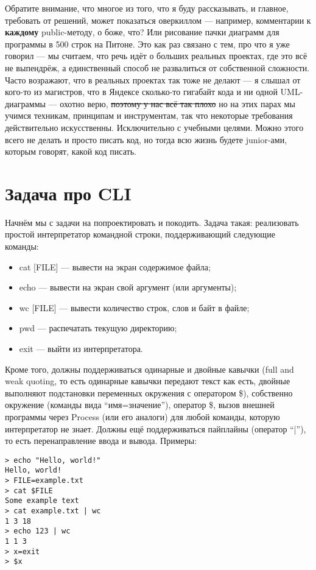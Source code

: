 \documentclass[a5paper]{article}
\begin{document}
Обратите внимание, что многое из того, что я буду рассказывать, и главное, требовать от решений, может показаться оверкиллом --- например, комментарии к \textbf{каждому} public-методу, о боже, что? Или рисование пачки диаграмм для программы в 500 строк на Питоне. Это как раз связано с тем, про что я уже говорил --- мы считаем, что речь идёт о больших реальных проектах, где это всё не выпендрёж, а единственный способ не развалиться от собственной сложности. Часто возражают, что в реальных проектах так тоже не делают --- я слышал от кого-то из магистров, что в Яндексе сколько-то гигабайт кода и ни одной UML-диаграммы --- охотно верю, \sout{поэтому у нас всё так плохо} но на этих парах мы учимся техникам, принципам и инструментам, так что некоторые требования действительно искусственны. Исключительно с учебными целями. Можно этого всего не делать и просто писать код, но тогда всю жизнь будете junior-ами, которым говорят, какой код писать.

\section{Задача про CLI}
Начнём мы с задачи на попроектировать и покодить. Задача такая: реализовать простой интерпретатор командной строки, поддерживающий следующие команды:
\begin{itemize}
	\item cat [FILE] --- вывести на экран содержимое файла;
	\item echo --- вывести на экран свой аргумент (или аргументы);
	\item wc [FILE] --- вывести количество строк, слов и байт в файле;
	\item pwd --- распечатать текущую директорию;
	\item exit --- выйти из интерпретатора.
\end{itemize}
Кроме того, должны поддерживаться одинарные и двойные кавычки (full and weak quoting, то есть одинарные кавычки передают текст как есть, двойные выполняют подстановки переменных окружения с оператором \$), собственно окружение (команды вида ``имя=значение''), оператор \$, вызов внешней программы через Process (или его аналоги) для любой команды, которую интерпретатор не знает. Должны ещё поддерживаться пайплайны (оператор ``|''), то есть перенаправление ввода и вывода. Примеры:
\begin{verbatim}
> echo "Hello, world!"
Hello, world!
> FILE=example.txt
> cat $FILE
Some example text
> cat example.txt | wc
1 3 18
> echo 123 | wc
1 1 3
> x=exit
> $x
\end{verbatim}
\end{document}
